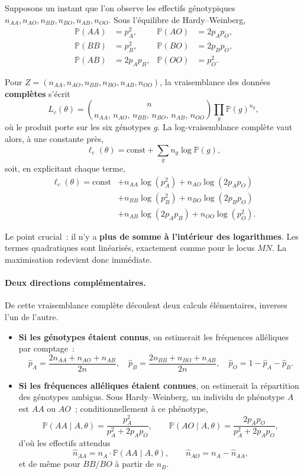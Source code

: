 \begin{exemple}
Supposons un instant que l'on observe les effectifs génotypiques
$n_{AA}, n_{AO}, n_{BB}, n_{BO}, n_{AB}, n_{OO}$. Sous l'équilibre de
Hardy--Weinberg,
\begin{align*}
\mathbb{P}(AA) &= p_A^2, & \mathbb{P}(AO) &= 2 p_A p_O, \\
\mathbb{P}(BB) &= p_B^2, & \mathbb{P}(BO) &= 2 p_B p_O, \\
\mathbb{P}(AB) &= 2 p_A p_B, & \mathbb{P}(OO) &= p_O^2 .
\end{align*}

Pour $Z = (n_{AA}, n_{AO}, n_{BB}, n_{BO}, n_{AB}, n_{OO})$, la vraisemblance des
données \textbf{complètes} s'écrit
$$
L_c(\theta) = \binom{n}{n_{AA},\, n_{AO},\, n_{BB},\, n_{BO},\, n_{AB},\, n_{OO}}
              \prod_{g} \mathbb{P}(g)^{n_g},
$$
où le produit porte sur les six génotypes $g$. La log-vraisemblance complète vaut
alors, à une constante près,
$$
\ell_c(\theta) = \text{const} + \sum_{g} n_g \log \mathbb{P}(g),
$$
soit, en explicitant chaque terme,
\begin{align*}
\ell_c(\theta) = \text{const}
  &+ n_{AA} \log(p_A^2) + n_{AO} \log(2 p_A p_O) \\
  &+ n_{BB} \log(p_B^2) + n_{BO} \log(2 p_B p_O) \\
  &+ n_{AB} \log(2 p_A p_B) + n_{OO} \log(p_O^2).
\end{align*}

Le point crucial~: il n'y a \textbf{plus de somme à l'intérieur des logarithmes}.
Les termes quadratiques sont linéarisés, exactement comme pour le locus $MN$.
La maximisation redevient donc immédiate.
\end{exemple}

\paragraph{Deux directions complémentaires.}
De cette vraisemblance complète découlent deux calculs élémentaires, inverses
l'un de l'autre.

\begin{itemize}
  \item \textbf{Si les génotypes étaient connus}, on estimerait les fréquences
        alléliques par comptage~:
        $$
        \hat{p}_A = \frac{2 n_{AA} + n_{AO} + n_{AB}}{2n}, \quad
        \hat{p}_B = \frac{2 n_{BB} + n_{BO} + n_{AB}}{2n}, \quad
        \hat{p}_O = 1 - \hat{p}_A - \hat{p}_B .
        $$
  \item \textbf{Si les fréquences alléliques étaient connues}, on estimerait la
        répartition des génotypes ambigus. Sous Hardy--Weinberg, un individu de
        phénotype $A$ est $AA$ ou $AO$~; conditionnellement à ce phénotype,
        $$
        \mathbb{P}(AA \mid A, \theta) = \frac{p_A^2}{p_A^2 + 2 p_A p_O}, \qquad
        \mathbb{P}(AO \mid A, \theta) = \frac{2 p_A p_O}{p_A^2 + 2 p_A p_O},
        $$
        d'où les effectifs attendus
        $$
        \hat{n}_{AA} = n_A \cdot \mathbb{P}(AA \mid A, \theta), \qquad
        \hat{n}_{AO} = n_A - \hat{n}_{AA},
        $$
        et de même pour $BB/BO$ à partir de $n_B$.
\end{itemize}

